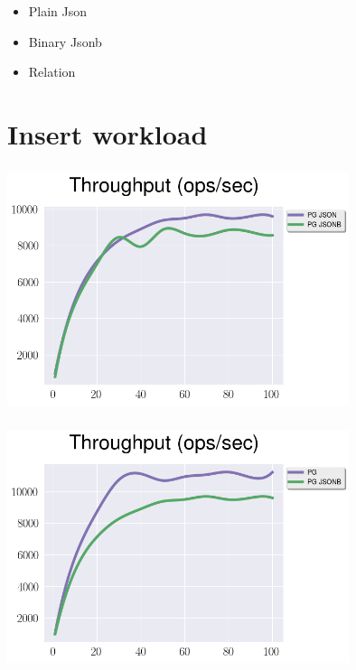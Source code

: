 \documentclass[usenames,dvipsnames, 18pt, compress, aspectratio=169]{beamer}
\begin{document}
\begin{frame}
    \frametitle{}
    \begin{center}

        \begin{itemize}[label={\MVRightarrow}]
            \item Plain Json
            \item Binary Jsonb
            \item Relation
        \end{itemize}

    \end{center}
\end{frame}

\fontsize{13pt}{14}\selectfont
\section{Insert workload}
\fontsize{17pt}{18}\selectfont

\begin{frame}
    \frametitle{}
    \begin{center}

        \includegraphics[width=0.75\textwidth,center]{json_vs_jsonb_insert.png}

    \end{center}
\end{frame}

\begin{frame}
    \frametitle{}
    \begin{center}

        \includegraphics[width=0.75\textwidth,center]{jsonb_vs_relation_insert.png}

    \end{center}
\end{frame}
\end{document}
